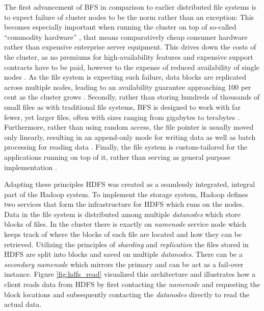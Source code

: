 The first advancement of \ac{BFS} in comparison to earlier distributed file systems is to expect failure of cluster nodes to be the norm rather than an exception: This becomes especially important when running the cluster on top of so-called \enquote{commodity hardware} \autocite[p.~1]{ghemawat2003gfs}, that means comparatively cheap consumer hardware rather than expensive enterprise server equipment. This drives down the costs of the cluster, as no premiums for high-availability features and expensive support contracts have to be paid, however to the expense of reduced availability of single nodes \autocite[p.~1]{ghemawat2003gfs}. As the file system is expecting such failure, data blocks are replicated across multiple nodes, leading to an availability guarantee approaching 100 per cent as the cluster grows \autocite[p.~2]{ghemawat2003gfs}. Secondly, rather than storing hundreds of thousands of small files as with traditional file systems, \ac{BFS} is designed to work with far fewer, yet larger files, often with sizes ranging from gigabytes to terabytes \autocite[p.~2]{ghemawat2003gfs}. Furthermore, rather than using random access, the file pointer is usually moved only linearly, resulting in an append-only mode for writing data as well as batch processing for reading data \autocite[p.~2]{ghemawat2003gfs}. Finally, the file system is custom-tailored for the applications running on top of it, rather than serving as general purpose implementation \autocite[p.~2]{ghemawat2003gfs}.

Adapting these principles \ac{HDFS} was created as a seamlessly integrated, integral part of the Hadoop system. 
To implement the storage system, 
Hadoop defines two services that form the infrastructure for \ac{HDFS} which runs on the nodes.
Data in the file system is distributed among multiple \emph{datanodes} which store blocks of files.
In the cluster there is exactly on \emph{namenode} service node which keeps track of where the blocks of each file are located and how they can be retrieved.
Utilizing the principles of \emph{sharding} and \emph{replication}
the files stored in \ac{HDFS} are split into blocks and saved on multiple \emph{datanodes}. 
There can be a \emph{secondary namenode} which  mirrors the primary and can be act as a fail-over instance.
Figure \ref{fig:hdfs_read} visualized this architecture 
and illustrates how a client reads data from \ac{HDFS} 
by first contacting the \emph{namenode} and requesting the block locations 
and subsequently contacting the \emph{datanodes} directly to read the actual data.

